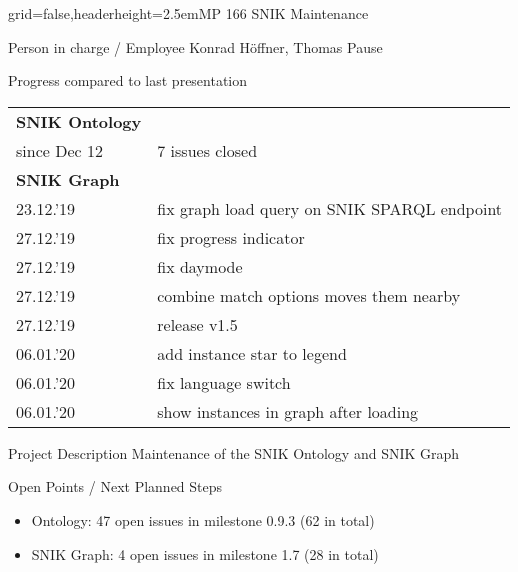 \documentclass[]{kiesgrube}
\begin{document}
\begin{poster}%
{grid=false,headerheight=2.5em}{}{MP 166 SNIK Maintenance}{}

\begin{posterbox}[name=person,column=0,row=0]{Person in charge / Employee}
Konrad Höffner, Thomas Pause
\end{posterbox}
\begin{posterbox}[name=progress,below=person]{Progress compared to last presentation}
\begin{tabulary}{\textwidth}{lL}
\textbf{SNIK Ontology} \\
since Dec 12	&7 issues closed\\
\textbf{SNIK Graph} \\
23.12.'19	&fix graph load query on SNIK SPARQL endpoint\\
27.12.'19	&fix progress indicator\\
27.12.'19	&fix daymode\\
27.12.'19	&combine match options moves them nearby\\
27.12.'19	&release v1.5 \\
06.01.'20	&add instance star to legend\\
06.01.'20	&fix language switch\\
06.01.'20	&show instances in graph after loading\\
\end{tabulary}
\end{posterbox}
\begin{posterbox}[name=description,column=1,row=0]{Project Description}
\small
Maintenance of the SNIK Ontology and SNIK Graph
\end{posterbox}
\begin{posterbox}[name=open,column=1,below=description]{Open Points / Next Planned Steps}
\footnotesize
\begin{itemize}
\item Ontology: 47 open issues in milestone 0.9.3 (62 in total)
\item SNIK Graph: 4 open issues in milestone 1.7 (28 in total)
\end{itemize}
\end{posterbox}

\end{poster}
\end{document}
